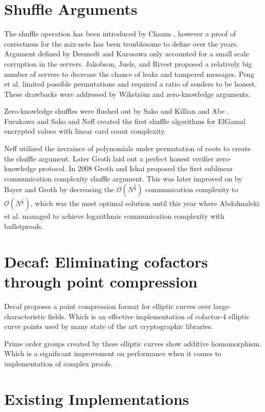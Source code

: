 \documentclass[12pt,a4paper]{report}
\begin{document}
\section{Shuffle Arguments}
The shuffle operation has been introduced by Chaum \cite{cha81}, however a proof of correctness for the mix-nets has been troublesome to define over the years.
Argument defined by Desmedt and Kurosawa \cite{dk00} only accounted for a small scale corruption in the servers. Jakobson, Juels, and Rivest \cite{jjr02} proposed a relatively big number of servers to decrease the chance of leaks and tampered messages. 
Peng et al. \cite{pbdv04} limited possible permutations and required a ratio of senders to be honest. 
These drawbacks were addressed by Wikström \cite{wik02} and zero-knowledge arguments.\par
Zero-knowledge shuffles were flushed out by Sako and Killian \cite{sk95} and Abe \cite{abe98, abe99, ah01}. 
Furukawa and Sako \cite{fs01} and Neff \cite{nef01, nef03} created the first shuffle algorithms for ElGamal encrypted values with linear card count complexity.\par
Neff \cite{nef01} utilized the invraince of polynomials under permutation of roots to create the shuffle argument. Later Groth \cite{gro10} laid out a perfect honest verifier zero-knowledge protocol.
In 2008 Groth and Ishai \cite{gi08} proposed the first sublinear communication complexity shuffle argument. 
This was later improved on by Bayer and Groth \cite{bgshuffle} by decreasing the $\mathcal{O}(N^{\frac{2}{3}})$ communication complexity to $\mathcal{O}(N^{\frac{1}{2}})$, 
which was the most optimal solution until this year where Abdolmaleki et al. \cite{bpshuffle} managed to achieve logarithmic communication complexity with bulletproofs.\par

\section{Decaf: Eliminating cofactors through point compression}
Decaf \cite{decaf} proposes a point compression format for elliptic curves over 
large-characteristic fields. Which is an effective implementation of cofactor-4 elliptic curve points
used by many state of the art cryptographic libraries.\par
Prime order groups created by these elliptic curves show additive homomorphism. Which is a significant
improvement on performance when it comes to implementation of complex proofs.
\section{Existing Implementations}
\end{document}
